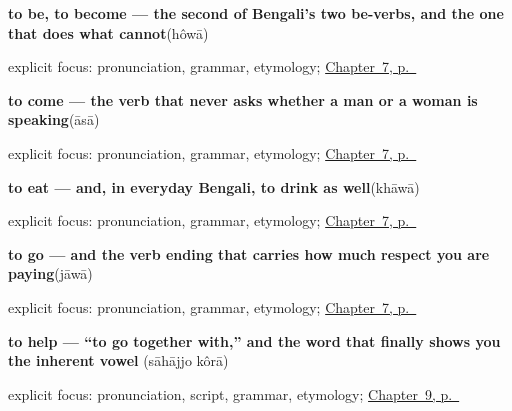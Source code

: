 \noindent\begin{minipage}[t]{\linewidth}
\raggedright
\textbf{to be, to become — the second of Bengali's two be-verbs, and the one that does what  cannot}\enspace\emph{}\enspace(hôwā)\par
\footnotesize explicit focus: pronunciation, grammar, etymology; \hyperref[ch:bn-core-verbs]{Chapter~7, p.~\pageref*{ch:bn-core-verbs}}
\end{minipage}\par\smallskip

\noindent\begin{minipage}[t]{\linewidth}
\raggedright
\textbf{to come — the verb that never asks whether a man or a woman is speaking}\enspace\emph{}\enspace(āsā)\par
\footnotesize explicit focus: pronunciation, grammar, etymology; \hyperref[ch:bn-core-verbs]{Chapter~7, p.~\pageref*{ch:bn-core-verbs}}
\end{minipage}\par\smallskip

\noindent\begin{minipage}[t]{\linewidth}
\raggedright
\textbf{to eat — and, in everyday Bengali, to drink as well}\enspace\emph{}\enspace(khāwā)\par
\footnotesize explicit focus: pronunciation, grammar, etymology; \hyperref[ch:bn-core-verbs]{Chapter~7, p.~\pageref*{ch:bn-core-verbs}}
\end{minipage}\par\smallskip

\noindent\begin{minipage}[t]{\linewidth}
\raggedright
\textbf{to go — and the verb ending that carries how much respect you are paying}\enspace\emph{}\enspace(jāwā)\par
\footnotesize explicit focus: pronunciation, grammar, etymology; \hyperref[ch:bn-core-verbs]{Chapter~7, p.~\pageref*{ch:bn-core-verbs}}
\end{minipage}\par\smallskip

\noindent\begin{minipage}[t]{\linewidth}
\raggedright
\textbf{to help — \textquotedblleft{}to go together with,\textquotedblright{} and the word that finally shows you the inherent vowel}\enspace\emph{ }\enspace(sāhājjo kôrā)\par
\footnotesize explicit focus: pronunciation, script, grammar, etymology; \hyperref[ch:bn-conjunct-verbs]{Chapter~9, p.~\pageref*{ch:bn-conjunct-verbs}}
\end{minipage}\par\smallskip

